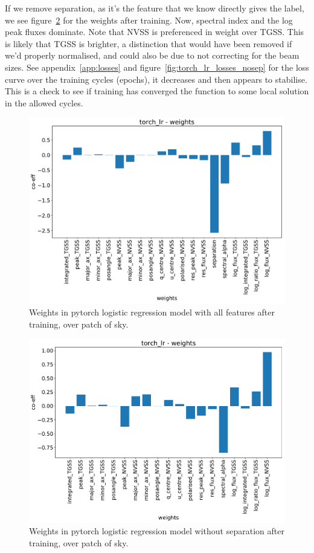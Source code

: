 \documentclass[12pt,a4paper]{article}
\begin{document}
If we remove separation, as it's the feature that we know directly gives the label, we see figure~\ref{fig:torch_lr_weights_nosep} for the weights after training. Now, spectral index and the log peak fluxes dominate. Note that NVSS is preferenced in weight over TGSS. This is likely that TGSS is brighter, a distinction that would have been removed if we'd properly normalised, and could also be due to not correcting for the beam sizes. See appendix~\ref{app:losses} and figure~\ref{fig:torch_lr_losses_nosep} for the loss curve over the training cycles (epochs), it decreases and then appears to stabilise. This is a check to see if training has converged the function to some local solution in the allowed cycles.

\newpage
\begin{figure}[H]
    \centering
    \includegraphics[height=0.41\textheight]{pics/torch_lr_weights.pdf}
    \caption{Weights in pytorch logistic regression model with all features after training, over patch of sky.}
    \label{fig:torch_lr_weights}
\end{figure}

\begin{figure}[H]
    \centering
    \includegraphics[height=0.41\textheight]{pics/torch_lr_weights_nosep.pdf}
    \caption{Weights in pytorch logistic regression model without separation after training, over patch of sky.}
    \label{fig:torch_lr_weights_nosep}
\end{figure}
\end{document}
